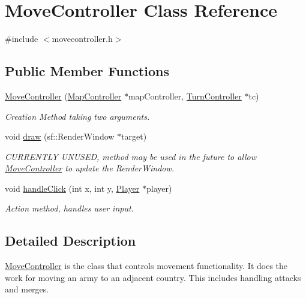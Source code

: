 \hypertarget{class_move_controller}{}\section{Move\+Controller Class Reference}
\label{class_move_controller}


{\ttfamily \#include $<$movecontroller.\+h$>$}

\subsection*{Public Member Functions}
\begin{DoxyCompactItemize}
\item 
\hyperlink{class_move_controller_adf3b8449aa76810b59d7fc79b99c6317}{Move\+Controller} (\hyperlink{class_map_controller}{Map\+Controller} $\ast$map\+Controller, \hyperlink{class_turn_controller}{Turn\+Controller} $\ast$tc)
\begin{DoxyCompactList}\small\item\em Creation Method taking two arguments. \end{DoxyCompactList}\item 
void \hyperlink{class_move_controller_a409253aac50aa25591f7189f7ba370f0}{draw} (sf\+::\+Render\+Window $\ast$target)
\begin{DoxyCompactList}\small\item\em C\+U\+R\+R\+E\+N\+T\+L\+Y U\+N\+U\+S\+E\+D, method may be used in the future to allow \hyperlink{class_move_controller}{Move\+Controller} to update the Render\+Window. \end{DoxyCompactList}\item 
void \hyperlink{class_move_controller_a6de846ed248aa533a8e5c57a40dee442}{handle\+Click} (int x, int y, \hyperlink{class_player}{Player} $\ast$player)
\begin{DoxyCompactList}\small\item\em Action method, handles user input. \end{DoxyCompactList}\end{DoxyCompactItemize}


\subsection{Detailed Description}
\hyperlink{class_move_controller}{Move\+Controller} is the class that controls movement functionality. It does the work for moving an army to an adjacent country. This includes handling attacks and merges. 

